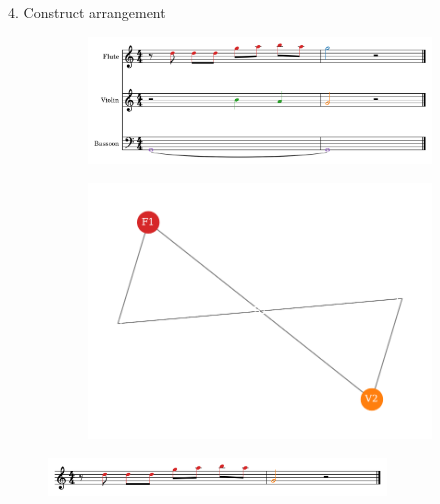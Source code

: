 \documentclass{beamer}
\begin{document}
\begin{frame}{4. Construct arrangement}
    \begin{figure}
        \begin{subfigure}{0.6\linewidth}
            \includegraphics[width=0.9\linewidth]{../Figures/toy-1.png}
        \end{subfigure}\hfill
        \begin{subfigure}{0.4\linewidth}
            \includegraphics[width=0.9\linewidth]{../Figures/toy_solution.pdf}
        \end{subfigure}
    \end{figure}
    \pause
    \centering
    \begin{figure}
        \includegraphics[width=0.8\textwidth]{../Figures/toy_arrangement-1.png}
    \end{figure}

\end{frame}
\end{document}

